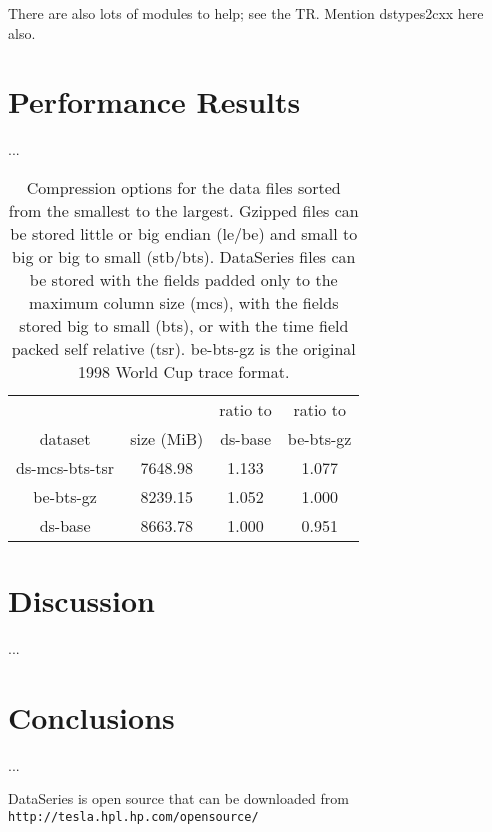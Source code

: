 \documentclass{acm_proc_article-sp}
\begin{document}
There are also lots of modules to help; see the TR.  Mention
dstypes2cxx here also.

\section{Performance Results}\label{sec:results}

...

\begin{table}
\centering
\begin{tabular}{|c|c|c|c|}\hline

               &            & ratio to & ratio to \\
    dataset    & size (MiB) & ds-base & be-bts-gz \\
\hline							   
ds-mcs-bts-tsr & 7648.98  & 1.133         & 1.077         \\
be-bts-gz      & 8239.15  & 1.052         & 1.000         \\
ds-base        & 8663.78  & 1.000         & 0.951         \\
\hline
\hline
\end{tabular}

\caption{Compression options for the data files sorted from the smallest 
to the largest.  Gzipped files can be stored little or big endian
(le/be) and small to big or big to small (stb/bts).  DataSeries files
can be stored with the fields padded only to the maximum column size
(mcs), with the fields stored big to small (bts), or with the time
field packed self relative (tsr). be-bts-gz is the original 1998 World
Cup trace format.}

\label{table:wc1998:compression}
\end{table}

\section{Discussion}\label{sec:discussion}

...

\section{Conclusions}\label{sec:conclusions}

...

DataSeries is open source that can be downloaded from {\tt
http://tesla.hpl.hp.com/opensource/}


{\small

}
%
%
\balancecolumns
\end{document}
